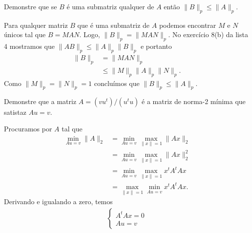 \begin{questions}
    \question Demonstre que se $B$ \'{e} uma submatriz qualquer de $A$ ent\~{a}o $\| B \|_p \leq \| A \|_p$.
    \begin{solution}
        Para qualquer matriz $B$ que \'{e} uma submatriz de $A$ podemos encontrar $M$ e $N$ \'{u}nicos tal que $B = M A N$. Logo, $\| B \|_p = \| M A N \|_p$. No exerc\'{i}cio 8(b) da lista 4 mostramos que $\| A B \|_p \leq \| A \|_p \| B \|_p$ e portanto
        \begin{align*}
            \| B \|_p &= \| M A N \|_p \\
            &\leq \| M \|_p \| A \|_p \| N \|_p.
        \end{align*}
        Como $\| M \|_p = \| N \|_p = 1$ conclu\'{i}mos que $\| B \|_p \leq \| A \|_p$.
    \end{solution}

    \question Demonstre que a matriz $A = (v u^t) / (u^t u)$ \'{e} a matriz de norma-2 m\'{i}nima que satistaz $A u = v$.
    \begin{solution}
        Procuramos por $A$ tal que
        \begin{align*}
            \min_{A u = v} \| A \|_2 &= \min_{A u = v} \max_{\| x \| = 1} \| A x \|_2 \\
            &= \min_{A u = v} \max_{\| x \| = 1} \| A x \|_2^2 \\
            &= \min_{A u = v} \max_{\| x \| = 1} x^t A^t A x \\
            &= \max_{\| x \| = 1} \min_{A u = v} x^t A^t A x.
        \end{align*}
        Derivando e igualando a zero, temos
        \begin{align*}
            \begin{cases}
                A^t A x = 0 \\
                A u = v
            \end{cases}
        \end{align*}
    \end{solution}
\end{questions}

